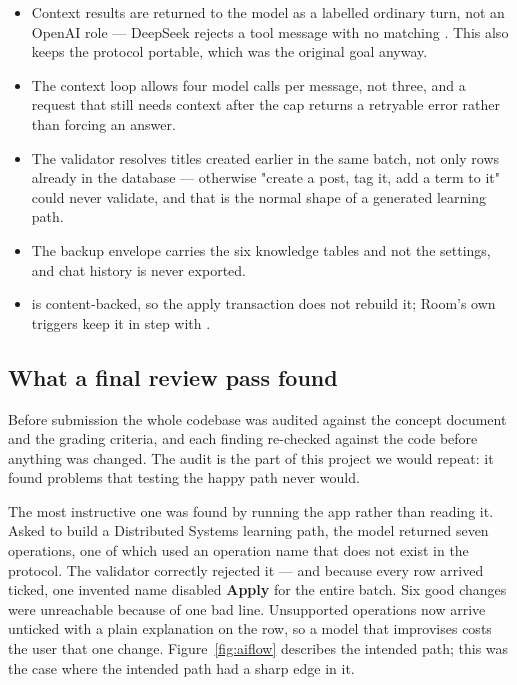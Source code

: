 \begin{itemize}
  \item Context results are returned to the model as a labelled ordinary turn, not an OpenAI
         role --- DeepSeek rejects a tool message with no matching .
        This also keeps the protocol portable, which was the original goal anyway.
  \item The context loop allows four model calls per message, not three, and a request that still
        needs context after the cap returns a retryable error rather than forcing an answer.
  \item The validator resolves titles created earlier in the same batch, not only rows already in the
        database --- otherwise "create a post, tag it, add a term to it" could never validate, and that
        is the normal shape of a generated learning path.
  \item The backup envelope carries the six knowledge tables and not the settings, and chat history is
        never exported.
  \item {} is content-backed, so the apply transaction does not rebuild it; Room's own
        triggers keep it in step with .
\end{itemize}

\subsection{What a final review pass found}

Before submission the whole codebase was audited against the concept document and the grading
criteria, and each finding re-checked against the code before anything was changed. The audit is the
part of this project we would repeat: it found problems that testing the happy path never would.

The most instructive one was found by running the app rather than reading it. Asked to build a
Distributed Systems learning path, the model returned seven operations, one of which used an
operation name that does not exist in the protocol. The validator correctly rejected it --- and
because every row arrived ticked, one invented name disabled \textbf{Apply} for the entire batch. Six
good changes were unreachable because of one bad line. Unsupported operations now arrive unticked
with a plain explanation on the row, so a model that improvises costs the user that one change.
Figure~\ref{fig:aiflow} describes the intended path; this was the case where the intended path had a
sharp edge in it.

